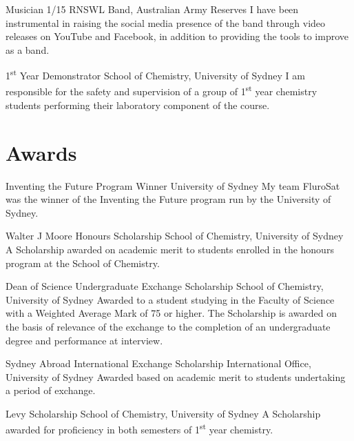 {Musician}
{1/15 RNSWL Band, Australian Army Reserves}
{}{}
{I have been instrumental in raising the social media presence of the band through video releases on YouTube and Facebook,
  in addition to providing the tools to improve as a band.
}

{1\textsuperscript{st} Year Demonstrator}
{School of Chemistry, University of Sydney}
{}{}
{I am responsible for the safety and supervision of a group of 1\textsuperscript{st} year chemistry students performing their laboratory component of the course.}

\section{Awards}

{Inventing the Future Program Winner}
{University of Sydney}{}{}
{My team FluroSat was the winner of the Inventing the Future program run by the University of Sydney.}

{Walter J Moore Honours Scholarship}
{School of Chemistry, University of Sydney}
{}{}
{A Scholarship awarded on academic merit to students enrolled in the honours program at the School of Chemistry.}

{Dean of Science Undergraduate Exchange Scholarship}
{School of Chemistry, University of Sydney}
{}{}
{Awarded to a student studying in the Faculty of Science with a Weighted Average Mark of 75 or higher. The Scholarship is awarded on the basis of relevance of the exchange to the completion of an undergraduate degree and performance at interview.}

{Sydney Abroad International Exchange Scholarship}
{International Office, University of Sydney}
{}{}
{Awarded based on academic merit to students undertaking a period of exchange.}

{Levy Scholarship}
{School of Chemistry, University of Sydney}
{}{}
{A Scholarship awarded for proficiency in both semesters of 1\textsuperscript{st} year chemistry.}


